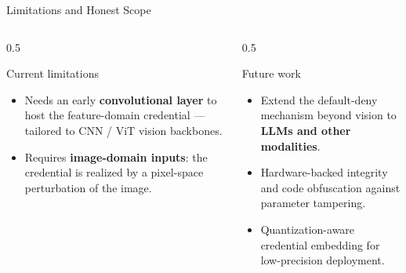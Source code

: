 \documentclass{beamer}
\begin{document}
\begin{frame}{Limitations and Honest Scope}
    \begin{columns}[T,totalwidth=\textwidth]
        \begin{column}{0.5\textwidth}
            \begin{block}{Current limitations}
                \begin{minipage}[t][3.6cm][t]{\linewidth}
                \footnotesize
                \begin{itemize}
                    \item Needs an early \textbf{convolutional layer} to host the feature-domain credential --- tailored to CNN / ViT vision backbones.
                    \item Requires \textbf{image-domain inputs}: the credential is realized by a pixel-space perturbation of the image.

                \end{itemize}
                \end{minipage}
            \end{block}
        \end{column}
        \begin{column}{0.5\textwidth}
            \begin{alertblock}{Future work}
                \begin{minipage}[t][3.6cm][t]{\linewidth}
                \footnotesize
                \begin{itemize}
                    \item Extend the default-deny mechanism beyond vision to \textbf{LLMs and other modalities}.
                    \item Hardware-backed integrity and code obfuscation against parameter tampering.
                    \item Quantization-aware credential embedding for low-precision deployment.
                \end{itemize}
                \end{minipage}
            \end{alertblock}
        \end{column}
    \end{columns}
\end{frame}
\end{document}
